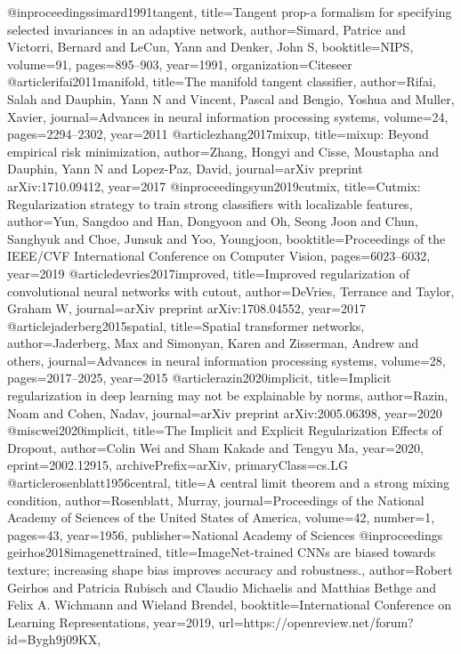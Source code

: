 \documentclass[nohyperref]{article}
\theoremstyle{plain}
\theoremstyle{definition}
\theoremstyle{remark}
\begin{document}
@inproceedings{simard1991tangent,
  title={Tangent prop-a formalism for specifying selected invariances in an adaptive network},
  author={Simard, Patrice and Victorri, Bernard and LeCun, Yann and Denker, John S},
  booktitle={NIPS},
  volume={91},
  pages={895--903},
  year={1991},
  organization={Citeseer}
}
@article{rifai2011manifold,
  title={The manifold tangent classifier},
  author={Rifai, Salah and Dauphin, Yann N and Vincent, Pascal and Bengio, Yoshua and Muller, Xavier},
  journal={Advances in neural information processing systems},
  volume={24},
  pages={2294--2302},
  year={2011}
}
@article{zhang2017mixup,
  title={mixup: Beyond empirical risk minimization},
  author={Zhang, Hongyi and Cisse, Moustapha and Dauphin, Yann N and Lopez-Paz, David},
  journal={arXiv preprint arXiv:1710.09412},
  year={2017}
}
@inproceedings{yun2019cutmix,
  title={Cutmix: Regularization strategy to train strong classifiers with localizable features},
  author={Yun, Sangdoo and Han, Dongyoon and Oh, Seong Joon and Chun, Sanghyuk and Choe, Junsuk and Yoo, Youngjoon},
  booktitle={Proceedings of the IEEE/CVF International Conference on Computer Vision},
  pages={6023--6032},
  year={2019}
}
@article{devries2017improved,
  title={Improved regularization of convolutional neural networks with cutout},
  author={DeVries, Terrance and Taylor, Graham W},
  journal={arXiv preprint arXiv:1708.04552},
  year={2017}
}
@article{jaderberg2015spatial,
  title={Spatial transformer networks},
  author={Jaderberg, Max and Simonyan, Karen and Zisserman, Andrew and others},
  journal={Advances in neural information processing systems},
  volume={28},
  pages={2017--2025},
  year={2015}
}
@article{razin2020implicit,
  title={Implicit regularization in deep learning may not be explainable by norms},
  author={Razin, Noam and Cohen, Nadav},
  journal={arXiv preprint arXiv:2005.06398},
  year={2020}
}
@misc{wei2020implicit,
      title={The Implicit and Explicit Regularization Effects of Dropout}, 
      author={Colin Wei and Sham Kakade and Tengyu Ma},
      year={2020},
      eprint={2002.12915},
      archivePrefix={arXiv},
      primaryClass={cs.LG}
}
@article{rosenblatt1956central,
  title={A central limit theorem and a strong mixing condition},
  author={Rosenblatt, Murray},
  journal={Proceedings of the National Academy of Sciences of the United States of America},
  volume={42},
  number={1},
  pages={43},
  year={1956},
  publisher={National Academy of Sciences}
}
@inproceedings{
geirhos2018imagenettrained,
title={ImageNet-trained {CNN}s are biased towards texture; increasing shape bias improves accuracy and robustness.},
author={Robert Geirhos and Patricia Rubisch and Claudio Michaelis and Matthias Bethge and Felix A. Wichmann and Wieland Brendel},
booktitle={International Conference on Learning Representations},
year={2019},
url={https://openreview.net/forum?id=Bygh9j09KX},
}
\end{document}
